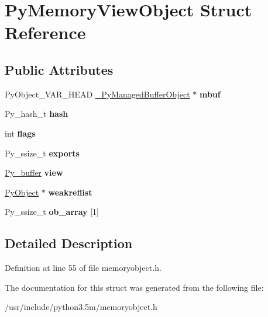 \hypertarget{structPyMemoryViewObject}{}\section{Py\+Memory\+View\+Object Struct Reference}
\label{structPyMemoryViewObject}
\subsection*{Public Attributes}
\begin{DoxyCompactItemize}
\item 
Py\+Object\+\_\+\+V\+A\+R\+\_\+\+H\+E\+AD \hyperlink{struct__PyManagedBufferObject}{\+\_\+\+Py\+Managed\+Buffer\+Object} $\ast$ {\bfseries mbuf}\hypertarget{structPyMemoryViewObject_a3f2795998b2e321404f16546220fe489}{}\label{structPyMemoryViewObject_a3f2795998b2e321404f16546220fe489}

\item 
Py\+\_\+hash\+\_\+t {\bfseries hash}\hypertarget{structPyMemoryViewObject_ac108de4518b5cd28d67f09774d0650f5}{}\label{structPyMemoryViewObject_ac108de4518b5cd28d67f09774d0650f5}

\item 
int {\bfseries flags}\hypertarget{structPyMemoryViewObject_a8cbdae36432c172551c6c6d85d2e1027}{}\label{structPyMemoryViewObject_a8cbdae36432c172551c6c6d85d2e1027}

\item 
Py\+\_\+ssize\+\_\+t {\bfseries exports}\hypertarget{structPyMemoryViewObject_a277792b3cadb340a1d1a8f1673982d4e}{}\label{structPyMemoryViewObject_a277792b3cadb340a1d1a8f1673982d4e}

\item 
\hyperlink{structbufferinfo}{Py\+\_\+buffer} {\bfseries view}\hypertarget{structPyMemoryViewObject_a0dd3ff4ff4e322d654468e5517b6a6a8}{}\label{structPyMemoryViewObject_a0dd3ff4ff4e322d654468e5517b6a6a8}

\item 
\hyperlink{struct__object}{Py\+Object} $\ast$ {\bfseries weakreflist}\hypertarget{structPyMemoryViewObject_aee27a2d4e913c7978a3c14c0de8ecd5c}{}\label{structPyMemoryViewObject_aee27a2d4e913c7978a3c14c0de8ecd5c}

\item 
Py\+\_\+ssize\+\_\+t {\bfseries ob\+\_\+array} \mbox{[}1\mbox{]}\hypertarget{structPyMemoryViewObject_a98430b1c46ab455746cde1267fdfb665}{}\label{structPyMemoryViewObject_a98430b1c46ab455746cde1267fdfb665}

\end{DoxyCompactItemize}


\subsection{Detailed Description}


Definition at line 55 of file memoryobject.\+h.



The documentation for this struct was generated from the following file\+:\begin{DoxyCompactItemize}
\item 
/usr/include/python3.\+5m/memoryobject.\+h\end{DoxyCompactItemize}
